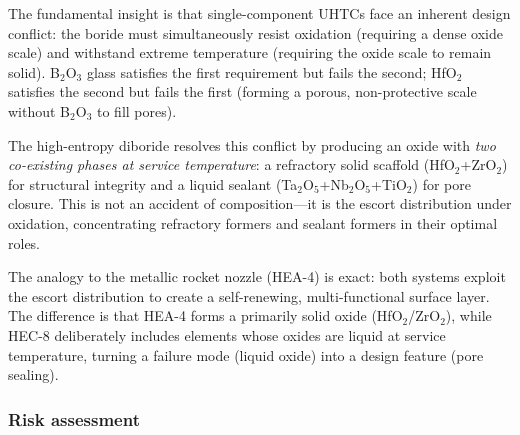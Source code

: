 \documentclass[12pt,letterpaper]{article}
\theoremstyle{definition}
\begin{document}
The fundamental insight is that single-component UHTCs face an inherent design conflict: the boride must simultaneously resist oxidation (requiring a dense oxide scale) and withstand extreme temperature (requiring the oxide scale to remain solid).  B$_2$O$_3$ glass satisfies the first requirement but fails the second; HfO$_2$ satisfies the second but fails the first (forming a porous, non-protective scale without B$_2$O$_3$ to fill pores).

The high-entropy diboride resolves this conflict by producing an oxide with \emph{two co-existing phases at service temperature}: a refractory solid scaffold (HfO$_2$+ZrO$_2$) for structural integrity and a liquid sealant (Ta$_2$O$_5$+Nb$_2$O$_5$+TiO$_2$) for pore closure.  This is not an accident of composition---it is the escort distribution under oxidation, concentrating refractory formers and sealant formers in their optimal roles.

The analogy to the metallic rocket nozzle (HEA-4) is exact: both systems exploit the escort distribution to create a self-renewing, multi-functional surface layer.  The difference is that HEA-4 forms a primarily solid oxide (HfO$_2$/ZrO$_2$), while HEC-8 deliberately includes elements whose oxides are liquid at service temperature, turning a failure mode (liquid oxide) into a design feature (pore sealing).

\subsubsection{Risk assessment}
\end{document}
